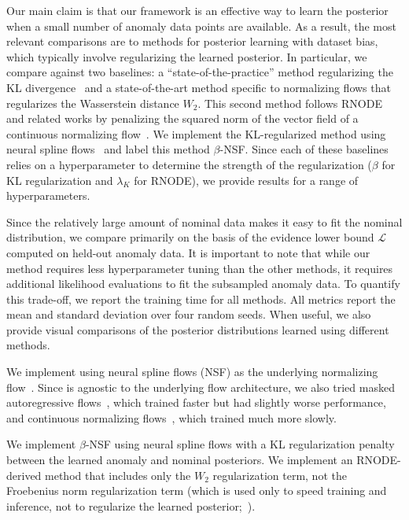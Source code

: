 Our main claim is that our \ouralg{} framework is an effective way to learn the posterior when a small number of anomaly data points are available. As a result, the most relevant comparisons are to methods for posterior learning with dataset bias, which typically involve regularizing the learned posterior. In particular, we compare against two baselines: a ``state-of-the-practice'' method regularizing the KL divergence~\cite{asimInvertibleGenerativeModels2020,higginsBetaVAELearningBasic2016} and a state-of-the-art method specific to normalizing flows that regularizes the Wasserstein distance $W_2$. This second method follows RNODE and related works by penalizing the squared norm of the vector field of a continuous normalizing flow~\cite{finlayHowTrainYour2020,onkenOTFlowFastAccurate2021}. We implement the KL-regularized method using neural spline flows~\cite{durkanNeuralSplineFlows2019} and label this method $\beta$-NSF. Since each of these baselines relies on a hyperparameter to determine the strength of the regularization ($\beta$ for KL regularization and $\lambda_K$ for RNODE), we provide results for a range of hyperparameters.

Since the relatively large amount of nominal data makes it easy to fit the nominal distribution, we compare primarily on the basis of the evidence lower bound $\mathcal{L}$ computed on held-out anomaly data. It is important to note that while our method requires less hyperparameter tuning than the other methods, it requires additional likelihood evaluations to fit the subsampled anomaly data. To quantify this trade-off, we report the training time for all methods. All metrics report the mean and standard deviation over four random seeds. When useful, we also provide visual comparisons of the posterior distributions learned using different methods.

We implement \ouralg{} using neural spline flows (NSF) as the underlying normalizing flow~\cite{durkanNeuralSplineFlows2019}. Since \ouralg{} is agnostic to the underlying flow architecture, we also tried masked autoregressive flows~\cite{huangNeuralAutoregressiveFlows2018}, which trained faster but had slightly worse performance, and continuous normalizing flows~\cite{chenNeuralOrdinaryDifferential2018}, which trained much more slowly.

We implement $\beta$-NSF using neural spline flows with a KL regularization penalty between the learned anomaly and nominal posteriors. We implement an RNODE-derived method that includes only the $W_2$ regularization term, not the Froebenius norm regularization term (which is used only to speed training and inference, not to regularize the learned posterior;~\cite{finlayHowTrainYour2020}).

